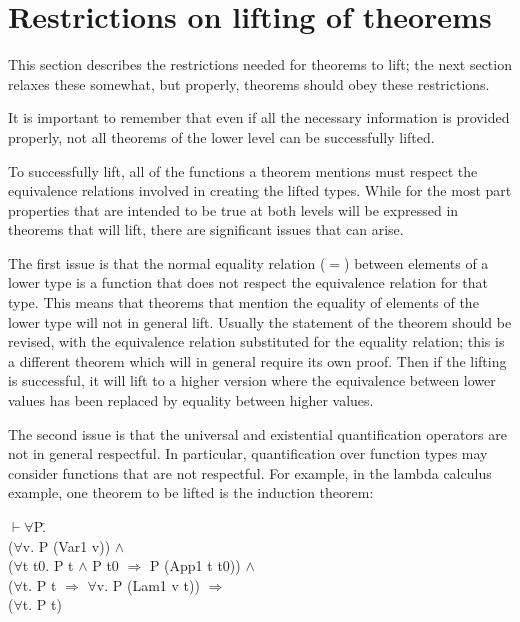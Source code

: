 \documentclass[envcountsame,runningheads]{llncs}
\begin{document}
%
\section{Restrictions on lifting of theorems}
%
\label{restrictions}

This section describes the restrictions needed for theorems to lift;
the next section relaxes these somewhat, but
properly, theorems should obey these restrictions.

It is important to remember that even if all the necessary information
is provided properly, not all theorems of the lower level
can be successfully lifted.

To successfully lift, all of the functions a theorem mentions must
respect the equivalence relations involved in creating the lifted types.
While for the most part properties that are intended to be true at
both levels will be expressed in theorems that will lift, there are
significant issues that can arise.

The first issue is that the normal equality relation ($=$) between elements
of a lower type is a function that does not respect the equivalence
relation for that type.  This means that theorems that mention the
equality of elements of the lower type will not in general lift.
Usually the statement of the theorem should be revised,
with the equivalence relation substituted for the equality relation;
this is a different theorem which will in general require its own proof.
Then if the lifting is successful, it will lift to
a higher version where the equivalence between lower values has been
replaced by equality between higher values.

The second issue is that the universal and existential quantification
operators
are not in general respectful.
In particular, quantification over function types
may consider functions that are not respectful.
For example, in the lambda calculus example, one theorem to be
lifted is the induction theorem:
{\tt \begin{tabbing}
\hspace{5.5mm}
    $\vdash \forall$P\=. \\
\>       ($\forall$v. P (Var1 v)) $\wedge$ \\
\>       ($\forall$t t0. P t $\wedge$ P t0 $\Rightarrow$ P (App1 t t0)) $\wedge$ \\
\>       ($\forall$t. P t $\Rightarrow$ $\forall$v. P (Lam1 v t)) $\Rightarrow$ \\
\>       ($\forall$t. P t)
\end{tabbing}}
\end{document}
